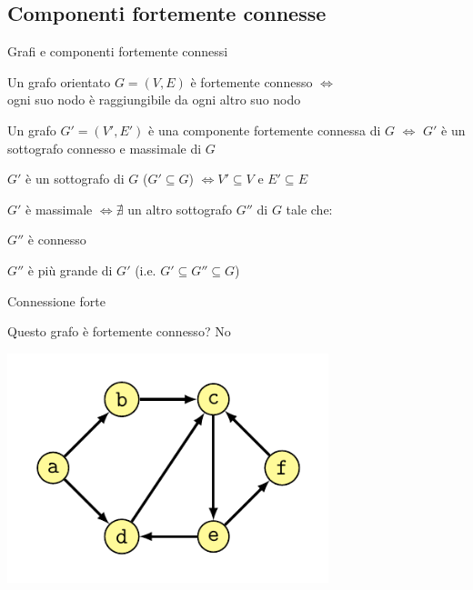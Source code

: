 \subsection{Componenti fortemente connesse}




\begin{frame}{Grafi e componenti fortemente connessi}

\vspace{-9pt}
\begin{myboxtitle}[Definizioni]
\BIL
\item Un grafo orientato $G=(V,E)$ è \alert{fortemente connesso} $\Leftrightarrow$\\ ogni
suo nodo è raggiungibile da ogni altro suo nodo
\item Un grafo $G'=(V',E')$ è una \alert{componente fortemente connessa} di $G$ $\Leftrightarrow$ $G'$ è un sottografo connesso e massimale di $G$
\EIL
\end{myboxtitle}

\begin{myboxtitle}
\BIL
\item $G'$ è un \alert{sottografo} di $G$ ($G' \subseteq G$) $\Leftrightarrow V' \subseteq V$ e $E' \subseteq E$
\item $G'$ è \alert{massimale} $\Leftrightarrow \nexists$ un altro sottografo $G''$ di $G$ tale che:
\BI
\item $G''$ è connesso 
\item $G''$ è più grande di $G'$ (i.e. $G' \subseteq G'' \subseteq G$)
\EI
\EIL
\end{myboxtitle}

\end{frame}

\begin{frame}{Connessione forte}

\vspace{-9pt}
\begin{myboxtitle}[Domanda]
Questo grafo è fortemente connesso? \pause \alert{No}
\end{myboxtitle}

\begin{overprint}
\centering\includegraphics[width=0.70\textwidth,page=1]{scc.pdf}
\end{overprint}

\end{frame}

